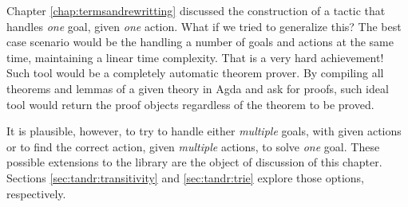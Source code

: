 Chapter \ref{chap:termsandrewritting} discussed the construction of a tactic that handles \emph{one}
goal, given \emph{one} action. What if we tried to generalize this?
The best case scenario would be the handling a number of goals and actions at the same time, 
maintaining a linear time complexity. That is a very hard achievement! 
Such tool would be a completely automatic theorem prover. By compiling all theorems and 
lemmas of a given theory in Agda and ask for proofs, such ideal tool would return the proof 
objects regardless of the theorem to be proved.

It is plausible, however, to try to handle either \emph{multiple} goals, with given actions or to find
the correct action, given \emph{multiple} actions, to solve \emph{one} goal. These possible
extensions to the library are the object of discussion of this chapter. Sections \ref{sec:tandr:transitivity}
and \ref{sec:tandr:trie} explore those options, respectively.
